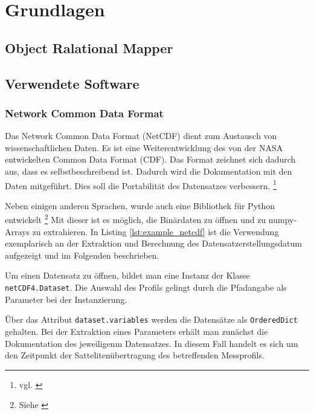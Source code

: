 \section{Grundlagen}

    \subsection{Object Ralational Mapper}

    \subsection{Verwendete Software}
    \subsubsection{Network Common Data Format}
    
    Das Network Common Data Format (NetCDF) dient zum Austausch von wissenschaftlichen Daten. Es ist eine Weiterentwicklung des von der NASA entwickelten Common Data Format (CDF). Das Format zeichnet sich dadurch aus, dass es selbstbeschreibend ist. Dadurch wird die Dokumentation mit den Daten mitgeführt. Dies soll die Portabilität des Datensatzes verbessern.  \footnote{vgl. \cite{FisherNetCDF}}
   
    Neben einigen anderen Sprachen, wurde auch eine Bibliothek für Python entwickelt \footnote{Siehe \cite{netCDF4}} Mit dieser ist es möglich, die Binärdaten zu öffnen und zu numpy-Arrays zu extrahieren. In Listing \ref{lst:example_netcdf} ist die Verwendung exemplarisch an der Extraktion und Berechnung des Datensatzerstellungsdatum aufgezeigt und im Folgenden beschrieben.
    
    
    Um einen Datensatz zu öffnen, bildet man eine Instanz der Klasse \texttt{netCDF4.Dataset}. Die Auswahl des Profils gelingt durch die Pfadangabe als Parameter bei der Instanzierung.
    
    Über das Attribut \texttt{dataset.variables} werden die Datensätze als \texttt{OrderedDict} gehalten. Bei der Extraktion eines Parameters erhält man zunächst die Dokumentation des jeweiligenm Datensatzes. In diesem Fall handelt es sich um den Zeitpunkt der Sattelitenübertragung des betreffenden Messprofils.
    
